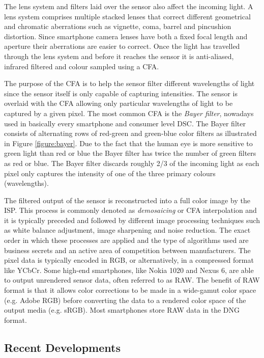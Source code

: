 \documentclass[thesis.tex]{subfiles}
\begin{document}
The lens system and filters laid over the sensor also affect the incoming light. A lens system comprises multiple stacked lenses that correct different geometrical and chromatic aberrations such as vignette, coma, barrel and pincushion distortion. Since smartphone camera lenses have both a fixed focal length and aperture their aberrations are easier to correct. Once the light has travelled through the lens system and before it reaches the sensor it is anti-aliased, infrared filtered and colour sampled using a CFA. \cite{color_pipeline}

The purpose of the CFA is to help the sensor filter different wavelengths of light since the sensor itself is only capable of capturing intensities. The sensor is overlaid with the CFA allowing only particular wavelengths of light to be captured by a given pixel. The most common CFA is the \textit{Bayer filter}, nowadays used in basically every smartphone and consumer level DSC. The Bayer filter consists of alternating rows of red-green and green-blue color filters as illustrated in Figure \ref{figure:bayer}. Due to the fact that the human eye is more sensitive to green light than red or blue the Bayer filter has twice the number of green filters as red or blue. The Bayer filter discards roughly 2/3 of the incoming light as each pixel only captures the intensity of one of the three primary colours (wavelengths).

The filtered output of the sensor is reconstructed into a full color image by the ISP. This process is commonly denoted as \textit{demosaicing} or CFA interpolation and it is typically preceded and followed by different image processing techniques such as white balance adjustment, image sharpening and noise reduction. The exact order in which these processes are applied and the type of algorithms used are business secrets and an active area of competition between manufacturers. The pixel data is typically encoded in RGB, or alternatively, in a compressed format like YCbCr. Some high-end smartphones, like Nokia 1020 and Nexus 6, are able to output unrendered sensor data, often referred to as RAW. The benefit of RAW format is that it allows color corrections to be made in a wide-gamut color space (e.g. Adobe RGB) before converting the data to a rendered color space of the output media (e.g. sRGB). Most smartphones store RAW data in the DNG format.

\subsection{Recent Developments}\label{chapter:solutions}
\end{document}
